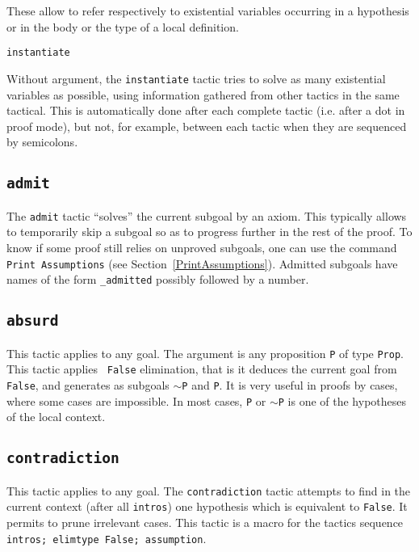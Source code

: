 \begin{coq_example*}
\begin{Variants}
These allow to refer respectively to existential variables occurring in
a hypothesis or in the body or the type of a local definition.

  \item {\tt instantiate}

    Without argument, the {\tt instantiate} tactic tries to solve as
    many existential variables as possible, using information gathered
    from other tactics in the same tactical. This is automatically
    done after each complete tactic (i.e. after a dot in proof mode),
    but not, for example, between each tactic when they are sequenced
    by semicolons.

\end{Variants}

\subsection{\tt admit}
\label{admit}

The {\tt admit} tactic ``solves'' the current subgoal by an
axiom. This typically allows to temporarily skip a subgoal so as to
progress further in the rest of the proof. To know if some proof still
relies on unproved subgoals, one can use the command {\tt Print
Assumptions} (see Section~\ref{PrintAssumptions}). Admitted subgoals
have names of the form {\ident}\texttt{\_admitted} possibly followed
by a number.

\subsection{\tt absurd \term}
\label{absurd}

This tactic applies to any goal. The argument {\term} is any
proposition {\tt P} of type {\tt Prop}. This tactic applies {\tt
  False} elimination, that is it deduces the current goal from {\tt
  False}, and generates as subgoals {\tt $\sim$P} and {\tt P}. It is
very useful in proofs by cases, where some cases are impossible. In
most cases, \texttt{P} or $\sim$\texttt{P} is one of the hypotheses of
the local context.

\subsection{\tt contradiction}
\label{contradiction}

This tactic applies to any goal. The {\tt contradiction} tactic
attempts to find in the current context (after all {\tt intros}) one
hypothesis which is equivalent to {\tt False}. It permits to prune
irrelevant cases. This tactic is a macro for the tactics sequence
{\tt intros; elimtype False; assumption}.


\end{coq_example*}
